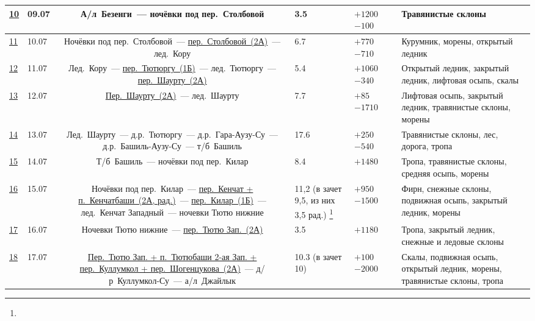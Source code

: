 {\begin{longtable}{|A|B|C|F|K|D|E|}
			\hyperref[subsec:Day10]{10}	&	09.07	&	А/л~Безенги~--- ночёвки под пер.~Столбовой 																																									&	3.5							&	$+1200$ $-100$	 		&			&	Травянистые склоны															\\ \hline
			\hyperref[subsec:Day11]{11}	&	10.07	&	Ночёвки под пер.~Столбовой~--- \hyperref[subsec:main_obstacles]{пер.~Столбовой~(2А)}~--- лед.~Кору 																											&	6.7							&	$+770$ $-710$	 		&			&	Курумник, морены, открытый ледник											\\ \hline
			\hyperref[subsec:Day12]{12}	&	11.07	&	Лед.~Кору~--- \hyperref[subsec:main_obstacles]{пер.~Тютюргу~(1Б)}~--- лед.~Тютюргу~--- \hyperref[subsec:main_obstacles]{пер.~Шаурту~(2А)}																	&	5.4							&	$+1060$ $-340$	 		&			&	Открытый ледник, закрытый ледник, лифтовая осыпь, скалы						\\ \hline
			\hyperref[subsec:Day13]{13}	&	12.07	&	\hyperref[subsec:main_obstacles]{Пер.~Шаурту~(2А)}~--- лед.~Шаурту 																																			&	7.7							&	$+85$ $-1710$	 		&			&	Лифтовая осыпь, закрытый ледник, травянистые склоны, морены					\\ \hline
			\hyperref[subsec:Day14]{14}	&	13.07	&	Лед.~Шаурту~--- д.р.~Тютюргу~--- д.р.~Гара-Аузу-Су~--- д.р.~Башиль-Аузу-Су~--- т/б~Башиль																													&	17.6						&	$+250$ $-540$	 		&			&	Травянистые склоны, лес, дорога, тропа										\\ \hline
			\hyperref[subsec:Day15]{15}	&	14.07	&	Т/б~Башиль~--- ночёвки под пер.~Килар																																										&	8.4							&	$+1480$ 		 		&			&	Тропа, травянистые склоны, средняя осыпь, морены							\\ \hline
			\hyperref[subsec:Day16]{16}	&	15.07	&	Ночёвки под пер.~Килар~--- \hyperref[subsec:main_obstacles]{пер.~Кенчат + п.~Кенчатбаши~(2А, рад.)}~--- \hyperref[subsec:main_obstacles]{пер.~Килар~(1Б)}~--- лед.~Кенчат Западный~--- ночевки Тютю нижние	&	11,2 (в зачет 9,5, из них 3,5 рад.) \footnote{\textTwo}	&	$+950$ $-1500$	&			&	Фирн, снежные склоны, подвижная осыпь, закрытый ледник, морены				\\ \hline
			\hyperref[subsec:Day17]{17}	&	16.07	&	Ночевки Тютю нижние~--- \hyperref[subsec:main_obstacles]{пер.~Тютю Зап.~(2А)}																																&	3.5							&	$+1180$					&			&	Тропа, закрытый ледник, снежные и ледовые склоны							\\ \hline
			\hyperref[subsec:Day18]{18}	&	17.07	&	\hyperref[subsec:main_obstacles]{Пер.~Тютю Зап. + п.~Тютюбаши 2-ая Зап. + пер.~Куллумкол + пер.~Шогенцукова~(2А)}~--- д/р~Куллумкол-Су~--- а/л~Джайлык														&	10.3 (в зачет 10)						&	$+100$ $-2000$		 	&			&	Скалы, подвижная осыпь, открытый ледник, морены, травянистые склоны, тропа	\\ \hline

\end{longtable}}
